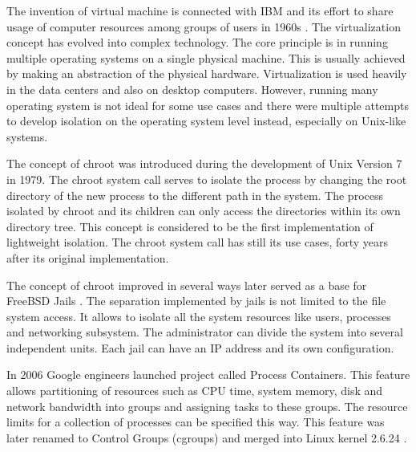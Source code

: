 \documentclass[
  digital, %
  twoside, %
  table,   %
  lof,     %
  lot,     %
]{fithesis3}
\begin{document}
The invention of virtual machine is connected with IBM and its effort to share usage of computer resources among groups of users in 1960s \cite{vm_history}. The virtualization concept has evolved into complex technology. The core principle is in running multiple operating systems on a single physical machine. This is usually achieved by making an abstraction of the physical hardware. Virtualization is used heavily in the data centers and also on desktop computers. However, running many operating system is not ideal for some use cases and there were multiple attempts to develop isolation on the operating system level instead, especially on Unix-like systems.

The concept of chroot \cite{chroot} was introduced during the development of Unix Version 7 in 1979. The chroot system call serves to isolate the process by changing the root directory of the new process to the different path in the system. The process isolated by chroot and its children can only access the directories within its own directory tree. This concept is considered to be the first implementation of lightweight isolation. The chroot system call has still its use cases, forty years after its original implementation.

The concept of chroot improved in several ways later served as a base for FreeBSD Jails \cite{freebsd_jails}. The separation implemented by jails is not limited to the file system access. It allows to isolate all the system resources like users, processes and networking subsystem. The administrator can divide the system into several independent units. Each jail can have an IP address and its own configuration.

In 2006 Google engineers launched project called Process Containers. This feature allows partitioning of resources such as CPU time, system memory, disk and network bandwidth into groups and assigning tasks to these groups. The resource limits for a collection of processes can be specified this way. This feature was later renamed to Control Groups (cgroups) and merged into Linux kernel 2.6.24 \cite{cgroups}.
\end{document}
